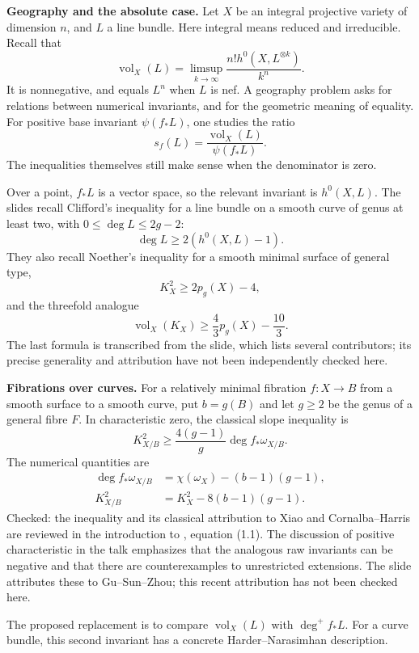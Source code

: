 \medskip\noindent
{\bf Geography and the absolute case.}
Let $X$ be an integral projective variety
of dimension $n$, and $L$ a line bundle.
Here integral means reduced and
irreducible. Recall that
$$
\operatorname{vol}_X(L)
=\limsup_{k\to\infty}
\frac{n!h^0(X,L^{\otimes k})}{k^n}.
$$
It is nonnegative, and equals $L^n$ when
$L$ is nef. A geography problem asks for
relations between numerical invariants,
and for the geometric meaning of equality.
For positive base invariant $\psi(f_*L)$,
one studies the ratio
$$
s_f(L)=
\frac{\operatorname{vol}_X(L)}{\psi(f_*L)}.
$$
The inequalities themselves still make
sense when the denominator is zero.

Over a point, $f_*L$ is a vector space,
so the relevant invariant is $h^0(X,L)$.
The slides recall Clifford's inequality
for a line bundle on a smooth curve of
genus at least two, with
$0\leq\deg L\leq 2g-2$:
$$
\deg L\geq 2(h^0(X,L)-1).
$$
They also recall Noether's inequality for
a smooth minimal surface of general type,
$$
K_X^2\geq 2p_g(X)-4,
$$
and the threefold analogue
$$
\operatorname{vol}_X(K_X)
\geq \frac43p_g(X)-\frac{10}{3}.
$$
The last formula is transcribed from the
slide, which lists several contributors;
its precise generality and attribution
have not been independently checked here.

\medskip\noindent
{\bf Fibrations over curves.}
For a relatively minimal fibration
$f\colon X\to B$ from a smooth surface
to a smooth curve, put $b=g(B)$ and let
$g\geq2$ be the genus of a general fibre
$F$. In characteristic zero, the classical
slope inequality is
$$
K_{X/B}^2
\geq \frac{4(g-1)}{g}
\deg f_*\omega_{X/B}.
$$
The numerical quantities are
$$
\begin{aligned}
\deg f_*\omega_{X/B}
&=\chi(\omega_X)
-(b-1)(g-1),\\
K_{X/B}^2
&=K_X^2-8(b-1)(g-1).
\end{aligned}
$$
Checked: the inequality and its classical
attribution to Xiao and Cornalba--Harris
are reviewed in the introduction to
\cite{zhang-slope-surfaces}, equation (1.1).
The discussion of positive characteristic
in the talk emphasizes that the analogous
raw invariants can be negative and that
there are counterexamples to unrestricted
extensions. The slide attributes these to
Gu--Sun--Zhou; this recent attribution has
not been checked here.

The proposed replacement is to compare
$\operatorname{vol}_X(L)$ with
$\deg^+ f_*L$. For a curve bundle, this
second invariant has a concrete
Harder--Narasimhan description.

